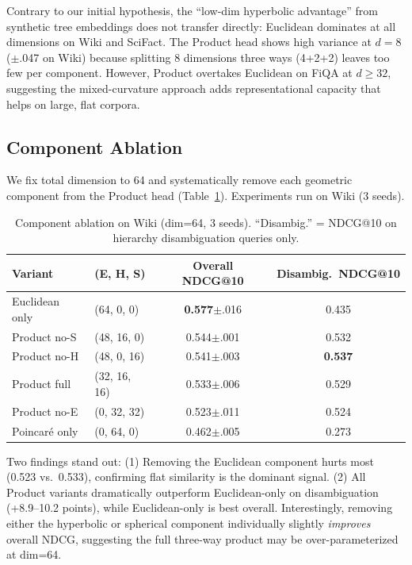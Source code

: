 \documentclass{article}
\begin{document}
Contrary to our initial hypothesis, the ``low-dim hyperbolic advantage'' from synthetic tree embeddings does not transfer directly: Euclidean dominates at all dimensions on Wiki and SciFact. The Product head shows high variance at $d{=}8$ ($\pm$.047 on Wiki) because splitting 8 dimensions three ways (4+2+2) leaves too few per component. However, Product overtakes Euclidean on FiQA at $d{\geq}32$, suggesting the mixed-curvature approach adds representational capacity that helps on large, flat corpora.

\subsection{Component Ablation}

We fix total dimension to 64 and systematically remove each geometric component from the Product head (Table~\ref{tab:ablation}). Experiments run on Wiki (3 seeds).

\begin{table}[h]
\centering
\small
\caption{Component ablation on Wiki (dim=64, 3 seeds). ``Disambig.'' = NDCG@10 on hierarchy disambiguation queries only.}
\label{tab:ablation}
\vspace{0.2cm}
\begin{tabular}{@{}llcc@{}}
\toprule
Variant & (E, H, S) & Overall NDCG@10 & Disambig.\ NDCG@10 \\
\midrule
Euclidean only  & (64, 0, 0) & \textbf{0.577}{\scriptsize$\pm$.016} & 0.435 \\
Product no-S    & (48, 16, 0) & 0.544{\scriptsize$\pm$.001} & 0.532 \\
Product no-H    & (48, 0, 16) & 0.541{\scriptsize$\pm$.003} & \textbf{0.537} \\
Product full    & (32, 16, 16) & 0.533{\scriptsize$\pm$.006} & 0.529 \\
Product no-E    & (0, 32, 32) & 0.523{\scriptsize$\pm$.011} & 0.524 \\
Poincar\'e only & (0, 64, 0) & 0.462{\scriptsize$\pm$.005} & 0.273 \\
\bottomrule
\end{tabular}
\end{table}

Two findings stand out: (1) Removing the Euclidean component hurts most (0.523 vs.\ 0.533), confirming flat similarity is the dominant signal. (2) All Product variants dramatically outperform Euclidean-only on disambiguation (+8.9--10.2 points), while Euclidean-only is best overall. Interestingly, removing either the hyperbolic or spherical component individually slightly \emph{improves} overall NDCG, suggesting the full three-way product may be over-parameterized at dim=64.
\end{document}
